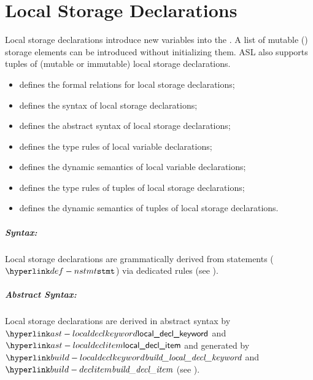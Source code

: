 \chapter{Local Storage Declarations\label{chap:LocalStorageDeclarations}}

Local storage declarations introduce new variables into the \localstaticenvironmentterm.
A list of mutable (\Tvar) storage elements can be introduced without initializing them.
ASL also supports tuples of (mutable or immutable) local storage declarations.


\ChapterOutline
\begin{itemize}
  \item {} defines the formal relations for local storage declarations;
  \item {} defines the syntax of local storage declarations;
  \item {} defines the abstract syntax of local storage declarations;
  \item {} defines the type rules of local variable declarations;
  \item {} defines the dynamic semantics of local variable declarations;
  \item {} defines the type rules of tuples of local storage declarations;
  \item {} defines the dynamic semantics of tuples of local storage declarations.
\end{itemize}

\paragraph{Syntax:} Local storage declarations are grammatically derived from statements ($\Nstmt$)
  via dedicated rules (see ).

\paragraph{Abstract Syntax:} Local storage declarations are derived in abstract syntax by\\
$\localdeclkeyword$ and $\localdeclitem$
and generated by $\buildlocaldeclkeyword$ and $\builddeclitem$
(see ).

